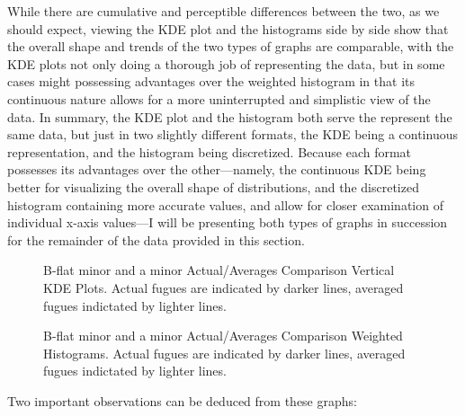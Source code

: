 While there are cumulative and perceptible differences between the two,
as we should expect, viewing the KDE plot and the histograms side by
side show that the overall shape and trends of the two types of graphs
are comparable, with the KDE plots not only doing a thorough job of
representing the data, but in some cases might possessing advantages
over the weighted histogram in that its continuous nature allows for a
more uninterrupted and simplistic view of the data. In summary, the KDE
plot and the histogram both serve the represent the same data, but just
in two slightly different formats, the KDE being a continuous
representation, and the histogram being discretized. Because each format
possesses its advantages over the other---namely, the continuous KDE
being better for visualizing the overall shape of distributions, and the
discretized histogram containing more accurate values, and allow for
closer examination of individual x-axis values---I will be
presenting both types of graphs in succession for the remainder of the
data provided in this section.




\begin{figure}[H]
    \begin{center}
    \caption[B-flat minor and a minor Actual/Averages Comparison Vertical KDE Plots. ]{B-flat minor and a minor Actual/Averages Comparison Vertical KDE Plots. Actual fugues are indicated by darker lines, averaged fugues indictated by lighter lines.}
    \end{center}
\end{figure}
    



\begin{figure}[H]
    \begin{center}
    \caption[B-flat minor and a minor Actual/Averages Comparison Weighted Histograms. ]{B-flat minor and a minor Actual/Averages Comparison Weighted Histograms. Actual fugues are indicated by darker lines, averaged fugues indictated by lighter lines.}
    \end{center}
\end{figure}
    
    Two important observations can be deduced from these graphs:

